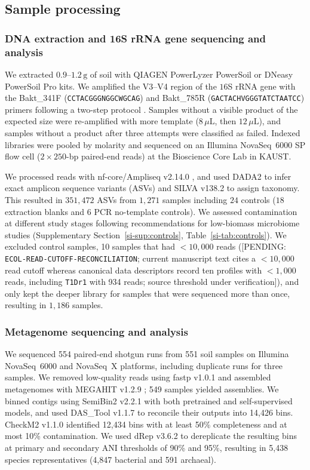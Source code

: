 \documentclass[fleqn,10pt,numbers]{olplainarticle}
\begin{document}
\subsection{Sample processing}
\subsubsection*{DNA extraction and 16S rRNA gene sequencing and analysis}
\label{sec:methods_sampleprocessing}
We extracted $0.9$--$1.2\,\mathrm{g}$ of soil with QIAGEN PowerLyzer PowerSoil or DNeasy PowerSoil Pro kits. We amplified the V3--V4 region of the $16$S rRNA gene with the Bakt\_341F (\texttt{CCTACGGGNGGCWGCAG}) and Bakt\_785R (\texttt{GACTACHVGGGTATCTAATCC}) primers \cite{klindworth2013primers} following a two-step protocol \cite{illumina16S}. Samples without a visible product of the expected size were re-amplified with more template ($8\,\mu\mathrm{L}$, then $12\,\mu\mathrm{L}$), and samples without a product after three attempts were classified as failed. Indexed libraries were pooled by molarity and sequenced on an Illumina NovaSeq~6000 SP flow cell ($2\times250$-bp paired-end reads) at the Bioscience Core Lab in KAUST.

We processed reads with nf-core/Ampliseq v2.14.0 \cite{nfcore, ampliseq}, and used DADA2 to infer exact amplicon sequence variants (ASVs) and SILVA v138.2 \cite{silva} to assign taxonomy. This resulted in $351,472$ ASVs from $1,271$ samples including $24$ controls ($18$ extraction blanks and $6$ PCR no-template controls). We assessed contamination at different study stages following recommendations for low-biomass microbiome studies \cite{fierer2025controls} (Supplementary Section~\ref{si-sup:controls}, Table~\ref{si-tab:controls}). We excluded control samples, 10 samples that had $< 10,000$ reads ([PENDING: \texttt{ECOL-READ-CUTOFF-RECONCILIATION}; current manuscript text cites a $<10{,}000$ read cutoff whereas canonical data descriptors record ten profiles with $<1{,}000$ reads, including \texttt{T1Dr1} with 934 reads; source threshold under verification]), and only kept the deeper library for samples that were sequenced more than once, resulting in $1,186$ samples.


\subsubsection{Metagenome sequencing and analysis}
We sequenced 554 paired-end shotgun runs from 551 soil samples on Illumina NovaSeq~6000 and NovaSeq~X platforms, including duplicate runs for three samples. We removed low-quality reads using fastp v1.0.1 \citep{chen2018fastp} and assembled metagenomes with MEGAHIT v1.2.9 \citep{li2015megahit}; 549 samples yielded assemblies. We binned contigs using SemiBin2 v2.2.1 \citep{pan2023semibin2} with both pretrained and self-supervised models, and used DAS\_Tool v1.1.7 \cite{sieber2018dastool} to reconcile their outputs into 14,426 bins. CheckM2 v1.1.0 \citep{chklovski2023checkm2} identified 12,434 bins with at least 50\% completeness and at most 10\% contamination. We used dRep v3.6.2 \citep{olm2017drep} to dereplicate the resulting bins at primary and secondary ANI thresholds of 90\% and 95\%, resulting in 5,438 species representatives (4,847 bacterial and 591 archaeal).
\end{document}
